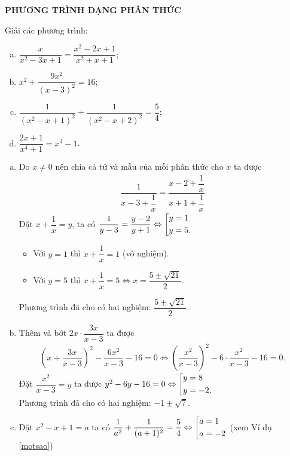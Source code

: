 \vspace{0.3cm}
\noindent \textbf{PHƯƠNG TRÌNH DẠNG PHÂN THỨC}
	\begin{bt}
		Giải các phương trình:
		\begin{multicols}{2}
			\begin{enumerate}[a)]
				\item $\dfrac{x}{x^2-3x+1} = \dfrac{x^2-2x+1}{x^2+x+1}$;
				\item $x^2 + \dfrac{9x^2}{(x-3)^2} = 16$;
				\item $\dfrac{1}{\left(x^2-x+1\right)^2} + \dfrac{1}{\left(x^2-x+2\right)^2} = \dfrac{5}{4}$;
				\item $\dfrac{2x+1}{x^4+1} = x^3-1$.
			\end{enumerate}
		\end{multicols}
		\loigiai 
		{
			\begin{enumerate}[a)]
				\item Do $x \ne 0$ nên chia cả tử và mẫu của mỗi phân thức cho $x$ ta được
					\begin{align*}
						\dfrac{1}{x-3 + \dfrac{1}{x}} = \dfrac{x-2+\dfrac{1}{x}}{x+1+\dfrac{1}{x}}
					\end{align*}
					Đặt $x + \dfrac{1}{x} = y$, ta có $\dfrac{1}{y-3} = \dfrac{y-2}{y+1} \Leftrightarrow \left[\begin{aligned}&y=1 \\ &y=5.\end{aligned}\right.$
					\begin{itemize}
						\item Với $y = 1$ thì $x + \dfrac{1}{x} = 1$ (vô nghiệm).
						\item  Với $y=5$ thì $x + \dfrac{1}{x} = 5 \Leftrightarrow x = \dfrac{5 \pm \sqrt{21}}{2}$.
					\end{itemize}
					Phương trình đã cho có hai nghiệm: $\dfrac{5 \pm \sqrt{21}}{2}$.
				\item Thêm và bớt $2x \cdot \dfrac{3x}{x-3}$ ta được
					\begin{align*}
						\left(x + \dfrac{3x}{x-3}\right)^2 - \dfrac{6x^2}{x-3} - 16 = 0 \Leftrightarrow \left(\dfrac{x^2}{x-3}\right)^2 - 6 \cdot \dfrac{x^2}{x-3} - 16 = 0.
					\end{align*}
					Đặt $\dfrac{x^2}{x-3} = y$ ta được $y^2 - 6y - 16 = 0 \Leftrightarrow \left[\begin{aligned}&y=8 \\ &y=-2.\end{aligned}\right.$ \\
					Phương trình đã cho có hai nghiệm: $-1 \pm \sqrt{7}$.
				\item Đặt $x^2-x+1 = a$ ta có $\dfrac{1}{a^2} + \dfrac{1}{(a+1)^2} = \dfrac{5}{4} \Leftrightarrow \left[\begin{aligned}&a=1 \\ &a=-2\end{aligned}\right.$ (xem Ví dụ \eqref{motsao})

\end{enumerate}}
\end{bt}
